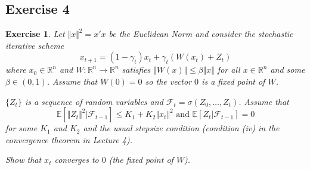 \documentclass[letter,11pt]{article}
\newtheorem{exercise}{Exercise}[section]
\begin{document}
\subsection{Exercise 4}


\begin{exercise} 
    Let $\Vert x \Vert^{2} = x'x$ be the Euclidean Norm and consider the stochastic iterative scheme
    $$ x_{t+1} = (1-\gamma_{t})x_{t} + \gamma_{t}(W(x_{t}) + Z_{t})$$
    where $x_{0} \in \mathbb{R}^{n}$ and  $W:\mathbb{R}^{n} \rightarrow \mathbb{R}^{n}$ satisfies $\Vert W(x) \Vert \leq \beta \Vert x \Vert$ for all $x \in \mathbb{R}^{n}$ and some $\beta \in (0,1)$. Assume that $W(0)=0$ so the vector $0$ is a fixed point of $W$. 

    $\{Z_{t}\}$ is a sequence of random variables and $\mathcal{F}_{t} = \sigma (Z_{0} , \ldots, Z_{t})$.  Assume that   $$\mathbb{E}[\Vert Z_{t} \Vert ^{2} | \mathcal{F}_{t-1} ]\leq K_{1} + K_{2} \Vert x_{t} \Vert ^{2} \text { and } \mathbb{E}[ Z_{t}  | \mathcal{F}_{t-1} ] = 0 $$
for some $K_{1}$ and $K_{2}$ and the usual stepsize condition (condition (iv) in the convergence theorem in Lecture 4). 

    Show that $x_{t} $ converges to $0$ (the fixed point of $W$). 
\end{exercise}
\end{document}
